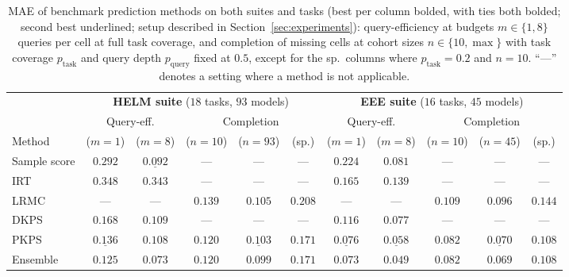 \documentclass{article}
\theoremstyle{definition}
\theoremstyle{remark}
\theoremstyle{plain}
\newcommand{\PKPS}{PKPS\xspace}
\begin{document}
\begin{table}[t!]
\centering
\caption{MAE of benchmark prediction methods on both suites and tasks (best per column
bolded, with ties both bolded; second best underlined; setup described in
Section~\ref{sec:experiments}):
query-efficiency at budgets $m\in\{1,8\}$ queries per cell at full task coverage, and
completion of missing cells at cohort sizes $n\in\{10,\max\}$ with task coverage
$p_{\mathrm{task}}$ and query depth $p_{\mathrm{query}}$ fixed at $0.5$, except for the
sp.\ columns where $p_{\mathrm{task}}{=}0.2$ and $n{=}10$. ``---'' denotes a setting where a method is not
applicable.}
\label{tab:suite}
\footnotesize
\setlength{\tabcolsep}{3.4pt}\renewcommand{\arraystretch}{0.95}
\begin{tabular}{lccccc ccccc}
\toprule
 & \multicolumn{5}{c}{\textbf{HELM suite} ($18$ tasks, $93$ models)}
 & \multicolumn{5}{c}{\textbf{EEE suite} ($16$ tasks, $45$ models)} \\
\cmidrule(lr){2-6}\cmidrule(lr){7-11}
 & \multicolumn{2}{c}{Query-eff.} & \multicolumn{3}{c}{Completion}
 & \multicolumn{2}{c}{Query-eff.} & \multicolumn{3}{c}{Completion} \\
Method & ($m{=}1$) & ($m{=}8$) & ($n{=}10$) & ($n{=}93$) & (sp.)
       & ($m{=}1$) & ($m{=}8$) & ($n{=}10$) & ($n{=}45$) & (sp.) \\
\midrule
Sample score       & $0.292$ & $\underline{0.092}$ & --- & --- & --- & $0.224$ & $0.081$ & --- & --- & --- \\
IRT                & $0.348$ & $0.343$ & --- & --- & --- & $0.165$ & $0.139$ & --- & --- & --- \\
LRMC               & --- & --- & $0.139$ & $0.105$ & $0.208$ & --- & --- & $0.109$ & $0.096$ & $0.144$ \\
DKPS               & $0.168$ & $0.109$ & --- & --- & --- & $0.116$ & $0.077$ & --- & --- & --- \\
\PKPS              & $\underline{0.136}$ & $0.108$ & $\mathbf{0.120}$ & $\underline{0.103}$ & $\mathbf{0.171}$ & $\underline{0.076}$ & $\underline{0.058}$ & $\mathbf{0.082}$ & $\underline{0.070}$ & $\mathbf{0.108}$ \\
Ensemble           & $\mathbf{0.125}$ & $\mathbf{0.073}$ & $\mathbf{0.120}$ & $\mathbf{0.099}$ & $\mathbf{0.171}$ & $\mathbf{0.073}$ & $\mathbf{0.049}$ & $\mathbf{0.082}$ & $\mathbf{0.069}$ & $\mathbf{0.108}$ \\
\bottomrule
\end{tabular}
\end{table}
\end{document}

